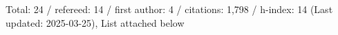 Total: 24 / refereed: 14 / first author: 4 / citations: 1,798 / h-index: 14 (Last updated: 2025-03-25), List attached below